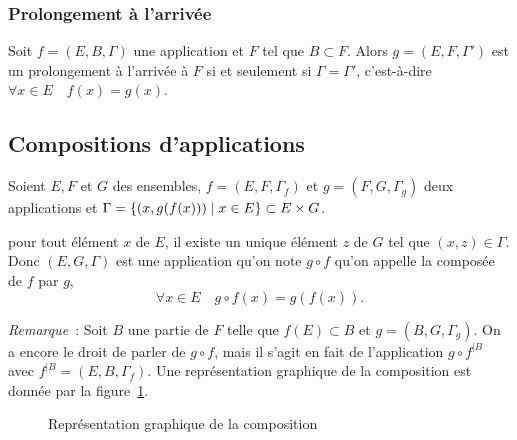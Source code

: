 \subsubsection{Prolongement à l'arrivée}
\label{chap3-subsubsec:prolongementarr}

Soit \(f = (E, B, \Gamma)\) une application et \(F\) tel que \(B \subset F\). Alors 
\(g = (E, F, \Gamma')\) est un prolongement à l'arrivée à \(F\) si et seulement si 
\(\Gamma = \Gamma'\), c'est-à-dire \(\forall x \in E \quad f(x) = g(x)\).

\subsection{Compositions d'applications}
\label{chap3-subsec:compapp}

\begin{defdef}
    Soient \(E, F\) et \(G\) des ensembles, \(f = (E, F, \Gamma_f)\) et \(g = (F,G, 
    \Gamma_g)\) deux applications et \(\Gamma = \left\{(x, g(f(x)))\mathrel{}\middle|\mathrel{}x \in E\right\} \subset 
    E \times G\).
\end{defdef}

pour tout élément \(x\) de \(E\), il existe un unique élément \(z\) de \(G\) tel 
que \((x, z) \in \Gamma\). Donc \((E, G, \Gamma)\) est une application qu'on note 
\(g \circ f\) qu'on appelle la composée de \(f\) par \(g\),
\begin{equation}
    \forall x \in E \quad g \circ f(x) = g(f(x)).
\end{equation}

\emph{Remarque}~: Soit \(B\) une partie de \(F\) telle que \(f(E) \subset B\) et 
\(g = (B, G, \Gamma_g)\). On a encore le droit de parler de \(g \circ f\), mais il 
s'agit en fait de l'application \(g \circ f^{|B}\) avec \( f^{|B} = (E, B, 
\Gamma_f)\). Une représentation graphique de la composition est donnée par la 
figure~\ref{chap3-fig:compose}.

\begin{figure}
    \centering
    \caption{Représentation graphique de la composition}
    \label{chap3-fig:compose}
\end{figure}

